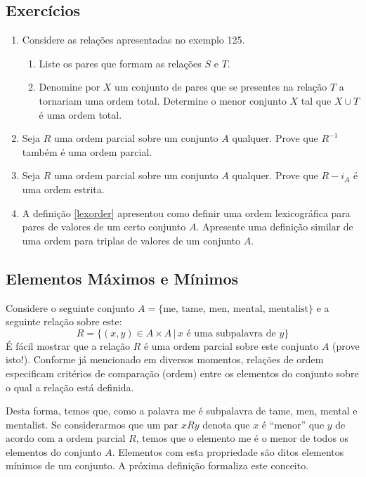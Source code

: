 \subsection{Exercícios}
\begin{enumerate}
  \item Considere as relações apresentadas no exemplo
    125.
  \begin{enumerate}
    \item Liste os pares que formam as relações $S$ e $T$.
    \item Denomine por $X$ um conjunto de pares que se presentes na
      relação $T$ a tornariam uma ordem total. Determine o menor
      conjunto $X$ tal que $X \cup T$ é uma ordem total.
  \end{enumerate}
  \item Seja $R$ uma ordem parcial sobre um conjunto $A$
    qualquer. Prove que $R^{-1}$ também é uma ordem parcial.
  \item Seja $R$ uma ordem parcial sobre um conjunto $A$ qualquer.
   Prove que $R - i_A$ é uma ordem estrita.
  \item A definição \ref{lexorder} apresentou como definir uma ordem
   lexicográfica para pares de valores de um certo conjunto
   $A$. Apresente uma definição similar de uma ordem para triplas de
   valores de um conjunto $A$.
\end{enumerate}

\subsection{Elementos Máximos e Mínimos}

Considere o seguinte conjunto $A =\{\text{me, tame, men, mental,
  mentalist}\}$ e a seguinte relação sobre este:
\[
R = \{(x,y)\in A \times A\,|\,x \text{ é uma subpalavra de }y\}
\]
É fácil mostrar que a relação $R$ é uma ordem parcial sobre este
conjunto $A$ (prove isto!). Conforme já mencionado em diversos
momentos, relações de ordem especificam critérios de comparação
(ordem) entre os elementos do conjunto sobre o qual a relação está definida.

Desta forma, temos que, como a palavra me é subpalavra de tame, men,
mental e mentalist. Se considerarmos que um par $xRy$ denota que $x$ é
``menor'' que $y$ de acordo com a ordem parcial $R$, temos que o
elemento me é o menor de todos os elementos do conjunto $A$. Elementos
com esta propriedade são ditos elementos mínimos de um conjunto. A
próxima definição formaliza este conceito.

